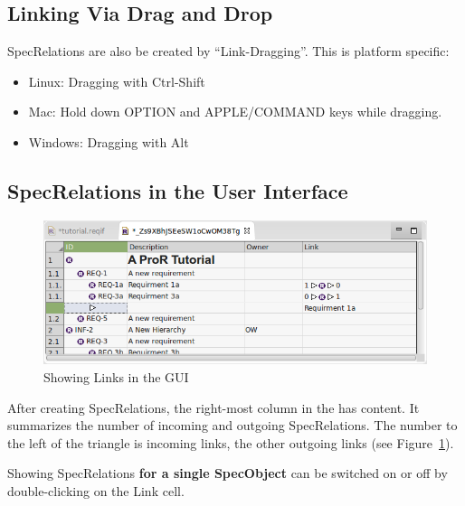 \subsection{Linking Via Drag and Drop}

SpecRelations are also be created by ``Link-Dragging''.  This is platform specific:

\begin{itemize}

\item
  Linux: Dragging with Ctrl-Shift
\item
  Mac: Hold down OPTION and APPLE/COMMAND keys while dragging.
\item
  Windows: Dragging with Alt
\end{itemize}

\subsection{SpecRelations in the User Interface}

\begin{figure}   
\centering      
\includegraphics[width=0.8\linewidth]{../rmf-images/links.png}      
\caption{Showing Links in the GUI}      
\label{fig:linksInGui}
\end{figure}

After creating SpecRelations, the right-most column  in the  has content.  It summarizes the number of incoming and outgoing SpecRelations.  The number to the left of the triangle is incoming links, the other outgoing links (see Figure~\ref{fig:linksInGui}).

Showing SpecRelations \textbf{for a single SpecObject} can be switched on or off by double-clicking on the Link cell.

